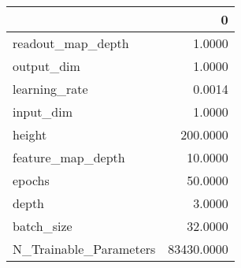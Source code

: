 \begin{tabular}{lr}
\toprule
{} &           0 \\
\midrule
readout\_map\_depth      &      1.0000 \\
output\_dim             &      1.0000 \\
learning\_rate          &      0.0014 \\
input\_dim              &      1.0000 \\
height                 &    200.0000 \\
feature\_map\_depth      &     10.0000 \\
epochs                 &     50.0000 \\
depth                  &      3.0000 \\
batch\_size             &     32.0000 \\
N\_Trainable\_Parameters &  83430.0000 \\
\bottomrule
\end{tabular}

